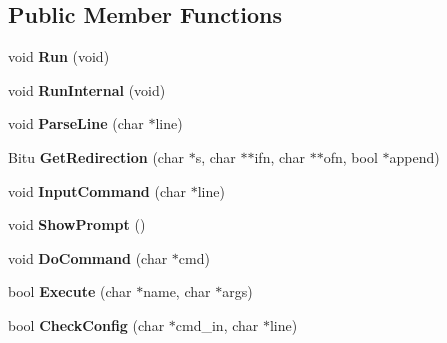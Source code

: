 \subsection*{Public Member Functions}
\begin{DoxyCompactItemize}
\item 
\hypertarget{classDOS__Shell_a37ec1896f94ab70c29368bd09fb71997}{void {\bfseries Run} (void)}\label{classDOS__Shell_a37ec1896f94ab70c29368bd09fb71997}

\item 
\hypertarget{classDOS__Shell_abba5a3bde7767e73ebbd1452de6ba3c0}{void {\bfseries Run\-Internal} (void)}\label{classDOS__Shell_abba5a3bde7767e73ebbd1452de6ba3c0}

\item 
\hypertarget{classDOS__Shell_ad4280cf9e2c07d534b7e32f9c58749d3}{void {\bfseries Parse\-Line} (char $\ast$line)}\label{classDOS__Shell_ad4280cf9e2c07d534b7e32f9c58749d3}

\item 
\hypertarget{classDOS__Shell_a0b5e187d0f5a8a0230ea9e741079018d}{Bitu {\bfseries Get\-Redirection} (char $\ast$s, char $\ast$$\ast$ifn, char $\ast$$\ast$ofn, bool $\ast$append)}\label{classDOS__Shell_a0b5e187d0f5a8a0230ea9e741079018d}

\item 
\hypertarget{classDOS__Shell_a3e2a3258d53dc6309adc9f1d3c8cde49}{void {\bfseries Input\-Command} (char $\ast$line)}\label{classDOS__Shell_a3e2a3258d53dc6309adc9f1d3c8cde49}

\item 
\hypertarget{classDOS__Shell_af64acad6a303bf9e0343dc5affb0642b}{void {\bfseries Show\-Prompt} ()}\label{classDOS__Shell_af64acad6a303bf9e0343dc5affb0642b}

\item 
\hypertarget{classDOS__Shell_a35c1864ac6ee344e53e76dc2811653bc}{void {\bfseries Do\-Command} (char $\ast$cmd)}\label{classDOS__Shell_a35c1864ac6ee344e53e76dc2811653bc}

\item 
\hypertarget{classDOS__Shell_afd2875b08f791d9100ef111800855f09}{bool {\bfseries Execute} (char $\ast$name, char $\ast$args)}\label{classDOS__Shell_afd2875b08f791d9100ef111800855f09}

\item 
\hypertarget{classDOS__Shell_a76295a24e50b9f37bff152be05c8ea93}{bool {\bfseries Check\-Config} (char $\ast$cmd\-\_\-in, char $\ast$line)}\label{classDOS__Shell_a76295a24e50b9f37bff152be05c8ea93}


\end{DoxyCompactItemize}
